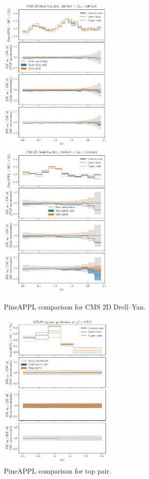 \begin{figure}
    \centering
    \includegraphics[width=0.5\textwidth]{figures/pineappl_CMSDY2D11_bin5}%
    \includegraphics[width=0.5\textwidth]{figures/pineappl_CMSDY2D11_bin6}
    \caption{PineAPPL comparison for CMS 2D Drell--Yan.}
    \label{fig:cmsdy2d11_bins56}
\end{figure}

\begin{figure}
    \centering
    \includegraphics[width=0.5\textwidth]{figures/pineappl_ATLAS_TTB_DIFF_8TEV_LJ_TRAP}%
    \caption{PineAPPL comparison for top pair.}
    \label{fig:cmsdy2d11_bins56}
\end{figure}
